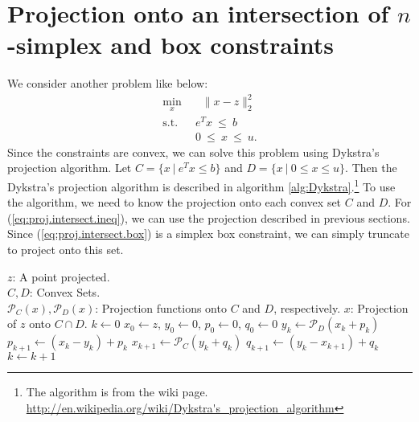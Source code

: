 \documentclass{siamltex}
\newcommand*{\bseq}{\begin{subequations}}
\newcommand*{\eseq}{\end{subequations}}
\newcommand*{\cP}{\mathcal P}
\newcommand*{\eqnok}[1]{(\ref{#1})}
\DeclareMathOperator*{\st}{\text{s.t.}}
\DeclareMathOperator*{\half}{\frac{1}{2}}
\begin{document}
\section{Projection onto an intersection of $n$-simplex and box constraints}
We consider another problem like below:
\bseq\begin{alignat}{2}\label{eq:proj.intersect}
 \min_{x} &~~ \half\|x-z\|_2^2 \\
 \st      &~~ e^T x ~\le~ b \label{eq:proj.intersect.ineq}\\
          &~~ 0 ~\le~ x ~\le~ u.\label{eq:proj.intersect.box}
\end{alignat}\eseq
Since the constraints are convex, we can solve this problem using Dykstra's projection algorithm. Let $C=\{x ~|~ e^Tx\le b\}$ and $D=\{x ~|~ 0\le x\le u\}$. Then the Dykstra's projection algorithm is described in algorithm \ref{alg:Dykstra}.\footnote{The algorithm is from the wiki page. \url{http://en.wikipedia.org/wiki/Dykstra's_projection_algorithm}} To use the algorithm, we need to know the projection onto each convex set $C$ and $D$. For \eqnok{eq:proj.intersect.ineq}, we can use the projection described in previous sections. Since \eqnok{eq:proj.intersect.box} is a simplex box constraint, we can simply truncate to project onto this set.
\begin{algorithm}[h]\small
\caption{$\mbox{\sc Projection onto $C\cap D$}$}\label{alg:Dykstra}
\begin{algorithmic}[1]
\REQUIRE $z$: A point projected.\\
$C, D$: Convex Sets.\\
$\cP_C(x), \cP_D(x)$: Projection functions onto $C$ and $D$, respectively.
\ENSURE $x$: Projection of $z$ onto $C\cap D$.
\medskip
\STATE $k\gets 0$
\STATE $x_0 \gets z$, $y_0 \gets 0$, $p_0 \gets 0$, $q_0 \gets 0$
\medskip
\REPEAT
\STATE $y_k\gets\cP_D(x_k+p_k)$
\STATE $p_{k+1}\gets (x_k-y_k)+p_k$
\STATE $x_{k+1}\gets \cP_C(y_k+q_k)$
\STATE $q_{k+1}\gets (y_k-x_{k+1})+q_k$
\STATE $k\gets k+1$ 
\end{algorithmic}
\end{algorithm}
\end{document}
